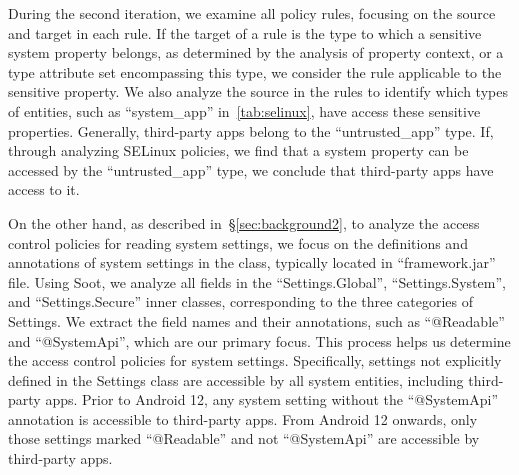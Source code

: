 During the second iteration, we examine all policy rules, focusing on the source and target in each rule. 
If the target of a rule is the type to which a sensitive system property belongs, as determined by the analysis of property context, or a type attribute set encompassing this type, we consider the rule applicable to the sensitive property.
We also analyze the source in the rules to identify which types of entities, such as ``system\_app'' in~\autoref{tab:selinux}, have access these sensitive properties.
Generally, third-party apps belong to the ``untrusted\_app'' type. 
If, through analyzing SELinux policies, we find that a system property can be accessed by the ``untrusted\_app'' type, we conclude that third-party apps have access to it.

On the other hand, as described in~\S\ref{sec:background2}, to analyze the access control policies for reading system settings, we focus on the definitions and annotations of system settings in the \texttt{} class, typically located in ``framework.jar'' file. 
Using Soot, we analyze all fields in the ``Settings.Global'', ``Settings.System'', and ``Settings.Secure'' inner classes, corresponding to the three categories of Settings.
We extract the field names and their annotations, such as ``@Readable'' and ``@SystemApi'', which are our primary focus.
This process helps us determine the access control policies for system settings. 
Specifically, settings not explicitly defined in the Settings class are accessible by all system entities, including third-party apps.
Prior to Android 12, any system setting without the ``@SystemApi'' annotation is accessible to third-party apps. 
From Android 12 onwards, only those settings marked ``@Readable'' and not ``@SystemApi'' are accessible by third-party apps.